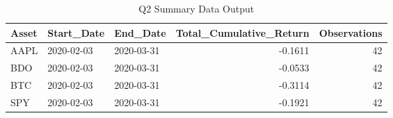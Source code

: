 \begin{table}[H]
\centering
\caption{Q2 Summary Data Output}
\label{tab:q2}
\begin{tabular}{lllrr}
\toprule
Asset & Start\_Date & End\_Date & Total\_Cumulative\_Return & Observations \\
\midrule
AAPL & 2020-02-03 & 2020-03-31 & -0.1611 & 42 \\
BDO & 2020-02-03 & 2020-03-31 & -0.0533 & 42 \\
BTC & 2020-02-03 & 2020-03-31 & -0.3114 & 42 \\
SPY & 2020-02-03 & 2020-03-31 & -0.1921 & 42 \\
\bottomrule
\end{tabular}
\end{table}
